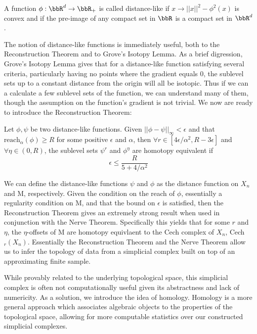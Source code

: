\begin{definition}
A function $\phi:\bbR^d \rightarrow \bbR_+$ is called distance-like if $x\rightarrow ||x||^2 -\phi^2(x)$ is convex and if the pre-image of any compact set in $\bbR$ is a compact set in $\bbR^d$. 
\end{definition}

The notion of distance-like functions is immediately useful, both to the Reconstruction Theorem and to Grove's Isotopy Lemma. As a brief digression, Grove's Isotopy Lemma gives that for a distance-like function satisfying several criteria, particularly having no points where the gradient equals 0, the sublevel sets up to a constant distance from the origin will all be isotopic. Thus if we can a calculate a few sublevel sets of the function, we can understand many of them, though the assumption on the function's gradient is not trivial. We now are ready to introduce the Reconstruction Theorem:


\begin{theorem}
Let $\phi, \psi$ be two distance-like functions. Given $||\phi - \psi||_\infty < \epsilon$ and that $\text{reach}_\alpha(\phi) \geq R$ for some positive $\epsilon$ and $\alpha$, then $\forall{r} \in [4\epsilon/\alpha^2, R-3\epsilon]$ and $\forall{\eta}\in(0, R)$, the sublevel sets $\psi^r$ and $\phi^\eta$ are homotopy equivalent if $$\epsilon \leq \frac{R}{5+4/\alpha^2}$$
\end{theorem}

We can define the distance-like functions $\psi$ and $\phi$ as the distance function on $X_n$ and M, respectively. Given the condition on the reach of $\phi$, essentially a regularity condition on M, and that the bound on $\epsilon$ is satisfied, then the Reconstruction Theorem gives an extremely strong result when used in conjunction with the Nerve Theorem. Specifically this yields that for some $r$ and $\eta$, the $\eta$-offsets of M are homotopy equivlaent to the Cech complex of $X_n$, Cech$_r(X_n)$. 
Essentially the Reconstruction Theorem and the Nerve Theorem allow us to infer the topology of data from a simplicial complex built on top of an approximating finite sample. 

While provably related to the underlying topological space, this simplicial complex is often not computationally useful given its abstractness and lack of numericity.
As a solution, we introduce the idea of homology. Homology is a more general approach which associates algebraic objects to the properties of the topological space, allowing for more computable statistics over our constructed simplicial complexes. 


